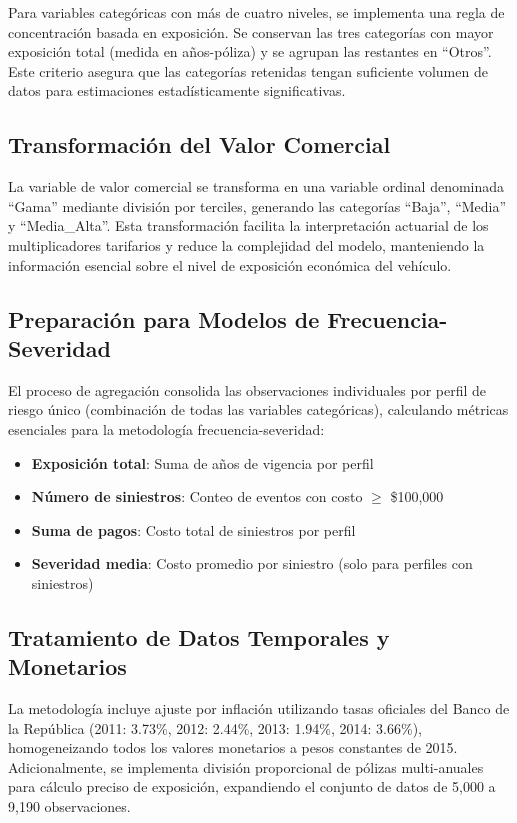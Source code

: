 Para variables categóricas con más de cuatro niveles, se implementa una regla de concentración basada en exposición. Se conservan las tres categorías con mayor exposición total (medida en años-póliza) y se agrupan las restantes en ``Otros''. Este criterio asegura que las categorías retenidas tengan suficiente volumen de datos para estimaciones estadísticamente significativas.

\subsection{Transformación del Valor Comercial}

La variable de valor comercial se transforma en una variable ordinal denominada ``Gama'' mediante división por terciles, generando las categorías ``Baja'', ``Media'' y ``Media\_Alta''. Esta transformación facilita la interpretación actuarial de los multiplicadores tarifarios y reduce la complejidad del modelo, manteniendo la información esencial sobre el nivel de exposición económica del vehículo.

\subsection{Preparación para Modelos de Frecuencia-Severidad}

El proceso de agregación consolida las observaciones individuales por perfil de riesgo único (combinación de todas las variables categóricas), calculando métricas esenciales para la metodología frecuencia-severidad:

\begin{itemize}
\item \textbf{Exposición total}: Suma de años de vigencia por perfil
\item \textbf{Número de siniestros}: Conteo de eventos con costo $\geq$ \$100,000
\item \textbf{Suma de pagos}: Costo total de siniestros por perfil
\item \textbf{Severidad media}: Costo promedio por siniestro (solo para perfiles con siniestros)
\end{itemize}

\subsection{Tratamiento de Datos Temporales y Monetarios}

La metodología incluye ajuste por inflación utilizando tasas oficiales del Banco de la República (2011: 3.73\%, 2012: 2.44\%, 2013: 1.94\%, 2014: 3.66\%), homogeneizando todos los valores monetarios a pesos constantes de 2015. Adicionalmente, se implementa división proporcional de pólizas multi-anuales para cálculo preciso de exposición, expandiendo el conjunto de datos de 5,000 a 9,190 observaciones.


